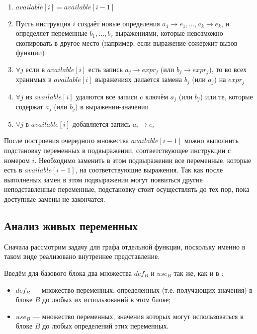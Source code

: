 \documentclass{article}
\begin{document}
\begin{enumerate}
    \item $available[i] = available[i-1]$
    \item Пусть инструкция $i$ создаёт новые определения $a_1 \rightarrow e_1, ..., a_k \rightarrow e_k$, и определяет переменные $b_1, ..., b_r$ выражениями, которые невозможно скопировать в другое место (например, если выражение сожержит вызов функции)
    \item $\forall j$ если в $available[i]$ есть запись $a_j \rightarrow expr_j$ (или $b_j \rightarrow expr_j$), то во всех хранимых в $available[i]$ выражениях делается замена $b_j$ (или $a_j$) на $expr_j$
    \item $\forall j$ из $available[i]$ удалются все записи c ключём $a_j$ (или $b_j$) или те, которые содержат $a_j$ (или $b_j$) в выражении-значении 
    \item $\forall j$ в $available[i]$ добавляется запись $a_i \rightarrow e_i$
\end{enumerate}

После построения очередного множества $available[i-1]$ можно выполнить подстановку переменных в подвыражении, соответствующее инструкции с номером $i$. Необходимо заменить в этом подвыражении все переменные, которые есть в $available[i-1]$, на соответствующие выражения.
Так как после выполненых замен в этом подвыражении могут появиться другие неподставленные переменные, подстановку стоит осуществлять до тех пор, пока доступные замены не закончатся.

\subsection{Анализ живых переменных}

Сначала рассмотрим задачу для графа отдельной функции, поскольку именно в таком виде реализовано внутреннее представление.

Введём для базового блока два множества $def_B$ и $use_B$ так же, как и в \cite[733]{dragonbook}:

\begin{itemize}
    \item $def_B$ — множество переменных, определенных (т.е. получающих значения) в блоке $B$ до любых их использований в этом блоке;
    \item $use_B$ — множество переменных, значения которых могут использоваться
    в блоке $B$ до любых определений этих переменных.
\end{itemize}
\end{document}
